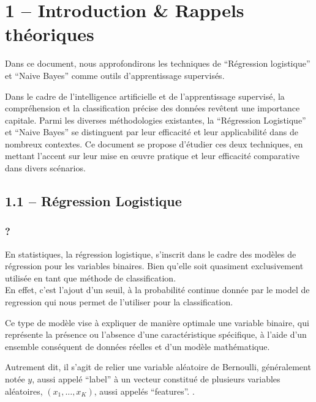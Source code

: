 \documentclass[
]{article}
\author{}
\date{}
\begin{document}
\intro{}

\hypertarget{introduction-rappels-thuxe9oriques}{%
\section{1 -- Introduction \& Rappels
théoriques}\label{introduction-rappels-thuxe9oriques}}

Dans ce document, nous approfondirons les techniques de ``Régression
logistique'' et ``Naive Bayes'' comme outils d'apprentissage supervisés.

Dans le cadre de l'intelligence artificielle et de l'apprentissage
supervisé, la compréhension et la classification précise des données
revêtent une importance capitale. Parmi les diverses méthodologies
existantes, la ``Régression Logistique'' et ``Naive Bayes'' se
distinguent par leur efficacité et leur applicabilité dans de nombreux
contextes. Ce document se propose d'étudier ces deux techniques, en
mettant l'accent sur leur mise en œuvre pratique et leur efficacité
comparative dans divers scénarios.

\hypertarget{ruxe9gression-logistique}{%
\subsection{1.1 -- Régression
Logistique}\label{ruxe9gression-logistique}}

\hypertarget{section}{%
\subsubsection{?}\label{section}}

En statistiques, la régression logistique, s'inscrit dans le cadre des
modèles de régression pour les variables binaires. Bien qu'elle soit
quasiment exclusivement utilisée en tant que méthode de
classification.\\
En effet, c'est l'ajout d'un seuil, à la probabilité continue donnée par
le model de regression qui nous permet de l'utiliser pour la
classification.

Ce type de modèle vise à expliquer de manière optimale une variable
binaire, qui représente la présence ou l'absence d'une caractéristique
spécifique, à l'aide d'un ensemble conséquent de données réelles et d'un
modèle mathématique.

Autrement dit, il s'agit de relier une variable aléatoire de Bernoulli,
généralement notée \(y\), aussi appelé ``label'' à un vecteur constitué
de plusieurs variables aléatoires, \((x_1, \ldots, x_K)\), aussi appelés
``features''. \cite{RegressionLogistique2023}.
\end{document}
